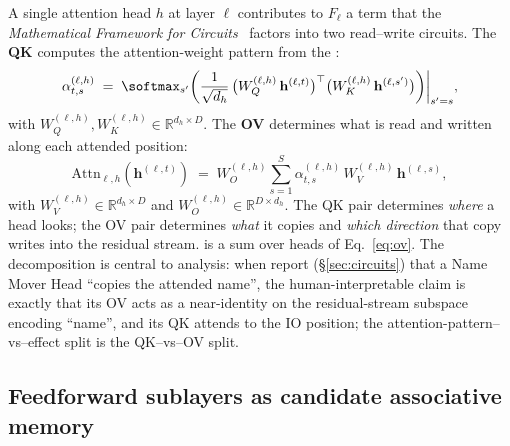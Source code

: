 A single attention head $h$ at layer $\ell$ contributes to $F_\ell$ a
term that the \emph{Mathematical Framework for 
Circuits}~ factors into two
read--write circuits. The \textbf{QK } computes the
attention-weight pattern from the :
\begin{equation}
  \alpha^{(\ell, h)}_{t, s}
  \;=\;
  \softmax_{s'}\!\left(\frac{1}{\sqrt{d_h}}\,
    \big(W_Q^{(\ell, h)}\,\mathbf{h}^{(\ell, t)}\big)^\top
    \big(W_K^{(\ell, h)}\,\mathbf{h}^{(\ell, s')}\big)
  \right)\!\bigg|_{s' = s},
  \label{eq:qk}
\end{equation}
with $W_Q^{(\ell, h)}, W_K^{(\ell, h)} \in \mathbb{R}^{d_h \times D}$.
The \textbf{OV } determines what is read and written along
each attended position:
\begin{equation}
  \mathrm{Attn}_{\ell, h}\!\left(\mathbf{h}^{(\ell, t)}\right)
  \;=\;
  W_O^{(\ell, h)}\sum_{s = 1}^{S}
    \alpha^{(\ell, h)}_{t, s}\,
    W_V^{(\ell, h)}\,\mathbf{h}^{(\ell, s)},
  \label{eq:ov}
\end{equation}
with $W_V^{(\ell, h)} \in \mathbb{R}^{d_h \times D}$ and
$W_O^{(\ell, h)} \in \mathbb{R}^{D \times d_h}$. The QK pair determines
\emph{where} a head looks; the OV pair determines \emph{what} it
copies and \emph{which direction} that copy writes into the residual
stream.  is a sum over heads of
Eq.~\eqref{eq:ov}. The decomposition is central to 
analysis: when \citet{wang2022-ioi} report (\S\ref{sec:circuits})
that a Name Mover Head ``copies the attended name'', the
human-interpretable claim is exactly that its OV  acts as a
near-identity on the residual-stream subspace encoding ``name'', and
its QK  attends to the IO position; the
attention-pattern--vs--effect split is the QK--vs--OV split.

\subsection{Feedforward sublayers as candidate associative memory}
\label{sec:substrate-ffn}

